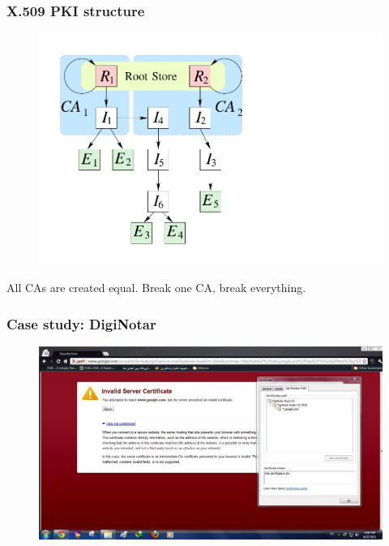 \begin{frame}
  \frametitle{X.509 PKI structure}
  \vspace{-2em}
  \begin{block}{}
    \begin{figure}
      \centering
      \includegraphics[height=.7\textheight]{figures/x509tree-simplified.pdf}
    \end{figure}
  \end{block}
  \begin{block}{\centering All CAs are created equal. Break one CA, break everything.}\end{block}
\end{frame}

\begin{frame}[fragile]
  \frametitle{Case study: DigiNotar}
    \begin{figure}
    \centering
     \includegraphics[width=.9\textwidth]{figures/gmail_iran.jpg}
    \end{figure}
\end{frame}


